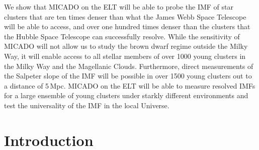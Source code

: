 \documentclass{aa}
\begin{document}
{We show that MICADO on the ELT will be able to probe the IMF of star clusters that are ten times denser than what the James Webb Space Telescope will be able to access,
and over one hundred times denser than the clusters that the Hubble Space Telescope can successfully resolve.
While the sensitivity of MICADO will not allow us to study the brown dwarf regime outside the Milky Way, it will enable access to all stellar members of over 1000 young clusters in the Milky Way and the Magellanic Clouds.
Furthermore, direct measurements of the Salpeter slope of the IMF will be possible in over 1500 young clusters out to a distance of 5\,Mpc.
MICADO on the ELT will be able to measure resolved IMFs for a large ensemble of young clusters under starkly different environments and test the universality of the IMF in the local Universe.}



\maketitle





\section{Introduction}
\label{sec:introduction}
\end{document}
